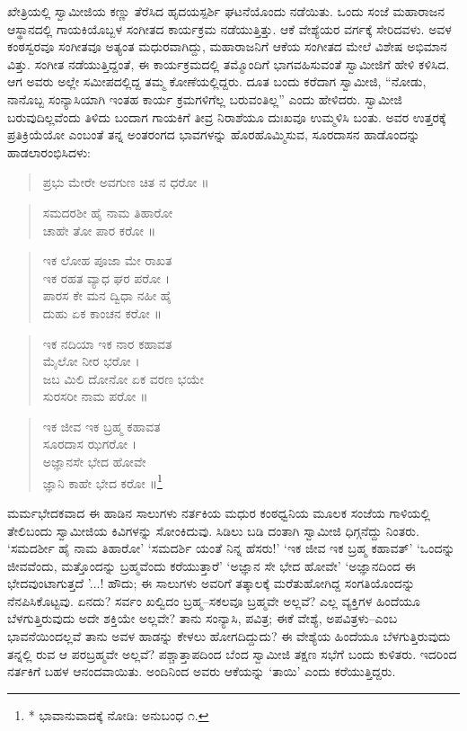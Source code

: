 ಖೇತ್ರಿಯಲ್ಲಿ ಸ್ವಾಮೀಜಿಯ ಕಣ್ಣು ತೆರೆಸಿದ ಹೃದಯಸ್ಪರ್ಶಿ ಘಟನೆಯೊಂದು ನಡೆಯಿತು. ಒಂದು ಸಂಜೆ ಮಹಾರಾಜನ ಆಸ್ಥಾನದಲ್ಲಿ ಗಾಯಕಿಯೊಬ್ಬಳ ಸಂಗೀತದ ಕಾರ್ಯಕ್ರಮ ನಡೆಯುತ್ತಿತ್ತು. ಆಕೆ ವೇಶ್ಯೆಯರ ವರ್ಗಕ್ಕೆ ಸೇರಿದವಳು. ಅವಳ ಕಂಠಸ್ವರವೂ ಸಂಗೀತವೂ ಅತ್ಯಂತ ಮಧುರವಾಗಿದ್ದು, ಮಹಾರಾಜನಿಗೆ ಆಕೆಯ ಸಂಗೀತದ ಮೇಲೆ ವಿಶೇಷ ಅಭಿಮಾನ ವಿತ್ತು. ಸಂಗೀತ ನಡೆಯುತ್ತಿದ್ದಂತೆ, ಈ ಕಾರ್ಯಕ್ರಮದಲ್ಲಿ ತಮ್ಮೊಂದಿಗೆ ಭಾಗವಹಿಸುವಂತೆ ಸ್ವಾಮೀಜಿಗೆ ಹೇಳಿ ಕಳಿಸಿದ. ಆಗ ಅವರು ಅಲ್ಲೇ ಸಮೀಪದಲ್ಲಿದ್ದ ತಮ್ಮ ಕೋಣೆಯಲ್ಲಿದ್ದರು. ದೂತ ಬಂದು ಕರೆದಾಗ ಸ್ವಾಮೀಜಿ, “ನೋಡು, ನಾನೊಬ್ಬ ಸಂನ್ಯಾಸಿಯಾಗಿ ಇಂತಹ ಕಾರ್ಯ ಕ್ರಮಗಳಿಗೆಲ್ಲ ಬರುವಂತಿಲ್ಲ” ಎಂದು ಹೇಳಿದರು. ಸ್ವಾಮೀಜಿ ಬರುವುದಿಲ್ಲವೆಂದು ತಿಳಿದು ಬಂದಾಗ ಗಾಯಕಿಗೆ ತೀವ್ರ ನಿರಾಶೆಯೂ ದುಃಖವೂ ಉಮ್ಮಳಿಸಿ ಬಂತು. ಅವರ ಉತ್ತರಕ್ಕೆ ಪ್ರತಿಕ್ರಿಯೆಯೋ ಎಂಬಂತೆ ತನ್ನ ಅಂತರಂಗದ ಭಾವಗಳನ್ನು ಹೊರಹೊಮ್ಮಿಸುವ, ಸೂರದಾಸನ ಹಾಡೊಂದನ್ನು ಹಾಡಲಾರಂಭಿಸಿದಳು:

\begin{verse}
ಪ್ರಭು ಮೇರೇ ಅವಗುಣ ಚಿತ ನ ಧರೋ ॥
\end{verse}

\begin{verse}
ಸಮದರಶೀ ಹೈ ನಾಮ ತಿಹಾರೋ\\ಚಾಹೇ ತೋ ಪಾರ ಕರೋ ॥
\end{verse}

\begin{verse}
ಇಕ ಲೋಹ ಪೂಜಾ ಮೇ ರಾಖತ\\ಇಕ ರಹತ ವ್ಯಾಧ ಘರ ಪರೋ ।\\ಪಾರಸ ಕೇ ಮನ ದ್ವಿಧಾ ನಹೀ ಹೈ\\ದುಹು ಏಕ ಕಾಂಚನ ಕರೋ ॥
\end{verse}

\begin{verse}
ಇಕ ನದಿಯಾ ಇಕ ನಾರ ಕಹಾವತ\\ಮೈಲೋ ನೀರ ಭರೋ ।\\ಜಬ ಮಿಲಿ ದೋನೋ ಏಕ ವರಣ ಭಯೇ\\ಸುರಸರೀ ನಾಮ ಪರೋ ॥
\end{verse}

\begin{verse}
ಇಕ ಜೀವ ಇಕ ಬ್ರಹ್ಮ ಕಹಾವತ\\ಸೂರದಾಸ ಝಗರೋ ।\\ಅಜ್ಞಾನಸೇ ಭೇದ ಹೋವೇ\\ಜ್ಞಾನಿ ಕಾಹೇ ಭೇದ ಕರೋ ॥\footnote{* ಭಾವಾನುವಾದಕ್ಕೆ ನೋಡಿ: ಅನುಬಂಧ ೧.}
\end{verse}

ಮರ್ಮಭೇದಕವಾದ ಈ ಹಾಡಿನ ಸಾಲುಗಳು ನರ್ತಕಿಯ ಮಧುರ ಕಂಠಧ್ವನಿಯ ಮೂಲಕ ಸಂಜೆಯ ಗಾಳಿಯಲ್ಲಿ ತೇಲಿಬಂದು ಸ್ವಾಮೀಜಿಯ ಕಿವಿಗಳನ್ನು ಸೋಂಕಿದುವು. ಸಿಡಿಲು ಬಡಿ ದಂತಾಗಿ ಸ್ವಾಮೀಜಿ ಧಿಗ್ಗನೆದ್ದು ನಿಂತರು. ‘ಸಮದರ್ಶೀ ಹೈ ನಾಮ ತಿಹಾರೋ’ ‘ಸಮದರ್ಶಿ ಯಂತೆ ನಿನ್ನ ಹೆಸರು!’ ‘ಇಕ ಜೀವ ಇಕ ಬ್ರಹ್ಮ ಕಹಾವತ್​’ ‘ಒಂದನ್ನು ಜೀವವೆಂದು, ಮತ್ತೊಂದನ್ನು ಬ್ರಹ್ಮವೆಂದು ಕರೆಯುತ್ತಾರೆ’ ‘ಅಜ್ಞಾನ ಸೇ ಭೇದ ಹೋವೇ’ ‘ಅಜ್ಞಾನದಿಂದ ಈ ಭೇದವುಂಟಾಗುತ್ತದೆ ’...! ಹೌದು; ಈ ಸಾಲುಗಳು ಅವರಿಗೆ ತತ್ಕಾಲಕ್ಕೆ ಮರೆತುಹೋಗಿದ್ದ ಸಂಗತಿಯೊಂದನ್ನು ನೆನಪಿಸಿಕೊಟ್ಟವು. ಏನದು? ಸರ್ವಂ ಖಲ್ವಿದಂ ಬ್ರಹ್ಮ–ಸಕಲವೂ ಬ್ರಹ್ಮವೇ ಅಲ್ಲವೆ? ಎಲ್ಲ ವ್ಯಕ್ತಿಗಳ ಹಿಂದೆಯೂ ಬೆಳಗುತ್ತಿರುವುದು ಅದೇ ಶಕ್ತಿಯೇ ಅಲ್ಲವೇ? ತಾನು ಸಂನ್ಯಾಸಿ, ಪವಿತ್ರ; ಈಕೆ ವೇಶ್ಯೆ, ಅಪವಿತ್ರಳು–ಎಂಬ ಭಾವನೆಯಿಂದಲ್ಲವೆ ತಾನು ಅವಳ ಹಾಡನ್ನು ಕೇಳಲು ಹೋಗದಿದ್ದುದು? ಈ ವೇಶ್ಯೆಯ ಹಿಂದೆಯೂ ಬೆಳಗುತ್ತಿರುವುದು ತನ್ನಲ್ಲಿ ರುವ ಆ ಪರಬ್ರಹ್ಮವೇ ಅಲ್ಲವೆ? ಪಶ್ಚಾತ್ತಾಪದಿಂದ ಬೆಂದ ಸ್ವಾಮೀಜಿ ತಕ್ಷಣ ಸಭೆಗೆ ಬಂದು ಕುಳಿತರು. ಇದರಿಂದ ನರ್ತಕಿಗೆ ಬಹಳ ಆನಂದವಾಯಿತು. ಅಂದಿನಿಂದ ಅವರು ಆಕೆಯನ್ನು ‘ತಾಯಿ’ ಎಂದು ಕರೆಯುತ್ತಿದ್ದರು.

